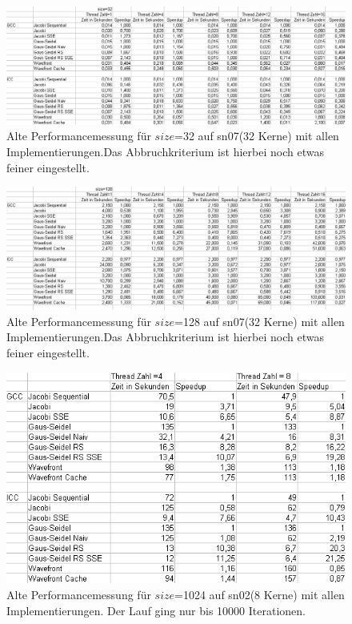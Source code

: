 \documentclass{article}
\begin{document}
\begin{figure}[h] 
  \centering
     \includegraphics[width=1.0\textwidth]{bilder/sn0732.png}
  \caption{Alte Performancemessung für $size$=32 auf sn07(32 Kerne) mit allen Implementierungen.Das Abbruchkriterium ist hierbei noch etwas feiner eingestellt.}
\end{figure}

\begin{figure}[h] 
  \centering
     \includegraphics[width=1.0\textwidth]{bilder/sn07128.png}
  \caption{Alte Performancemessung für $size$=128 auf sn07(32 Kerne) mit allen Implementierungen.Das Abbruchkriterium ist hierbei noch etwas feiner eingestellt.}
\end{figure}

\begin{figure}[h] 
  \centering
     \includegraphics[width=1.0\textwidth]{bilder/sn021024.png}
  \caption{Alte Performancemessung für $size$=1024 auf sn02(8 Kerne) mit allen Implementierungen. Der Lauf ging nur bis 10000 Iterationen.}
\end{figure}
\end{document}
